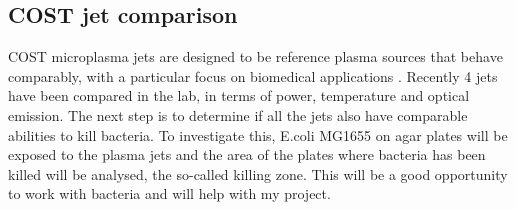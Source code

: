 \documentclass[11pt, oneside]{article}   	%
\newcommand{\todo}[1]{ \textcolor{red}{\bf{To Do:} #1}}
\begin{document}

\subsection{COST jet comparison}

COST microplasma jets are designed to be reference plasma sources that behave comparably, with a particular focus on biomedical applications \cite{Golda2016concepts}.
Recently 4 jets have been compared in the lab, in terms of power, temperature and optical emission.
The next step is to determine if all the jets also have comparable abilities to kill bacteria.
To investigate this, E.coli MG1655 on agar plates will be exposed to the plasma jets and the area of the plates where bacteria has been killed will be analysed, the so-called killing zone.
This will be a good opportunity to work with bacteria and will help with my project.

 
\end{document}
